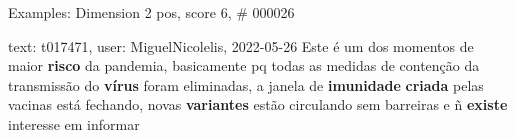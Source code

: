 \begin{frame}{Examples: Dimension 2 pos, score 6, \# 000026}
\footnotesize
\begin{exampleblock}{text: t017471, user: MiguelNicolelis, 2022-05-26}
Este é um dos momentos de maior \textbf{risco} da pandemia, basicamente pq 
todas as medidas de contenção da transmissão do \textbf{vírus} foram 
eliminadas, a janela de \textbf{imunidade} \textbf{criada} pelas vacinas está 
fechando, novas \textbf{variantes} estão circulando sem barreiras e ñ 
\textbf{existe} interesse em informar 
\end{exampleblock}
\end{frame}
